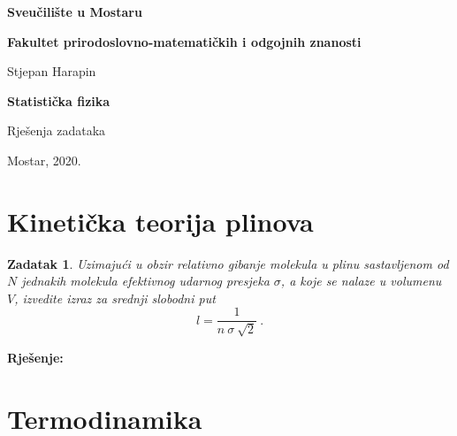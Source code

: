 \documentclass[a4paper,12pt]{article}
\newtheorem{ZDK}{Zadatak}[section]
\begin{document}
\begin{titlepage}
\centering
	{\textbf{Sveu\v{c}ili\v{s}te u Mostaru} \par}
	{\textbf{Fakultet prirodoslovno-matemati\v{c}kih i odgojnih znanosti} \par}
	\vspace{5cm}
	{\Large{Stjepan Harapin \par}}
	\vspace{3cm}
	{\LARGE{\textbf{Statisti\v{c}ka fizika} \par}}
	\vspace{1cm}
	{Rje\v{s}enja zadataka \par}
	\vfill
	{Mostar, 2020.}
\end{titlepage}

\tableofcontents
\setcounter{page}{1}
\newpage

\section{Kineti\v{c}ka teorija plinova}

\begin{ZDK}
	Uzimaju\'ci u obzir relativno gibanje molekula u plinu sastavljenom od $N$ jednakih molekula efektivnog udarnog presjeka $\sigma$, 
	a koje se nalaze u volumenu $V$, izvedite izraz za \textit{srednji slobodni put}
	$$ l = \frac{1}{n\ \sigma\ \sqrt{2}}\ . $$
\end{ZDK}
\textbf{Rje\v{s}enje:} \\
\newline





\newpage
\section{Termodinamika}
\end{document}
